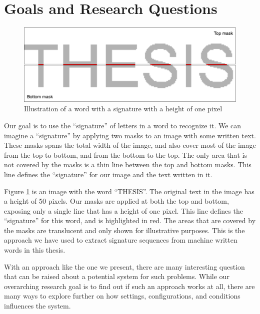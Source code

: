 
\section{Goals and Research Questions}
\label{sec:goals_and_research_questions}
\begin{figure}[ht]
    \centering
    \includegraphics[width=1.\textwidth]{fig/chapter1/signature2.png}
    \caption{Illustration of a word with a signature with a height of one pixel}
    \label{fig:thesis-signature}
\end{figure}

Our goal is to use the ``signature'' of letters in a word to recognize it. We can imagine a ``signature'' by applying two masks to an image with some written text. These masks spans the total width of the image, and also cover most of the image from the top to bottom, and from the bottom to the top. The only area that is not covered by the masks is a thin line between the top and bottom masks. This line defines the ``signature'' for our image and the text written in it. 

Figure \ref{fig:thesis-signature} is an image with the word ``THESIS''. The original text in the image has a height of 50 pixels. Our masks are applied at both the top and bottom, exposing only a single line that has a height of one pixel. This line defines the ``signature'' for this word, and is highlighted in red. The areas that are covered by the masks are translucent and only shown for illustrative purposes. This is the approach we have used to extract signature sequences from machine written words in this thesis.

With an approach like the one we present, there are many interesting question that can be raised about a potential system for such problems. While our overarching research goal is to find out if such an approach works at all, there are many ways to explore further on how settings, configurations, and conditions influences the system.

